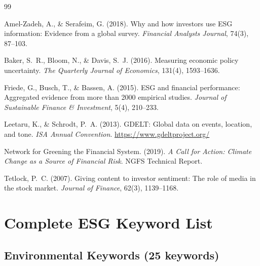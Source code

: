 \documentclass[12pt,a4paper]{article}
\begin{document}
\begin{thebibliography}{99}

Amel-Zadeh, A., \& Serafeim, G. (2018).
Why and how investors use ESG information: Evidence from a global survey.
\textit{Financial Analysts Journal}, 74(3), 87--103.

Baker, S.~R., Bloom, N., \& Davis, S.~J. (2016).
Measuring economic policy uncertainty.
\textit{The Quarterly Journal of Economics}, 131(4), 1593--1636.

Friede, G., Busch, T., \& Bassen, A. (2015).
ESG and financial performance: Aggregated evidence from more than 2000
empirical studies.
\textit{Journal of Sustainable Finance \& Investment}, 5(4), 210--233.

Leetaru, K., \& Schrodt, P.~A. (2013).
GDELT: Global data on events, location, and tone.
\textit{ISA Annual Convention}.
\url{https://www.gdeltproject.org/}

Network for Greening the Financial System. (2019).
\textit{A Call for Action: Climate Change as a Source of Financial Risk}.
NGFS Technical Report.

Tetlock, P.~C. (2007).
Giving content to investor sentiment: The role of media in the stock market.
\textit{Journal of Finance}, 62(3), 1139--1168.

\end{thebibliography}




\clearpage
\appendix

\section{Complete ESG Keyword List}
\label{app:keywords}

\subsection{Environmental Keywords (25 keywords)}
\end{document}
